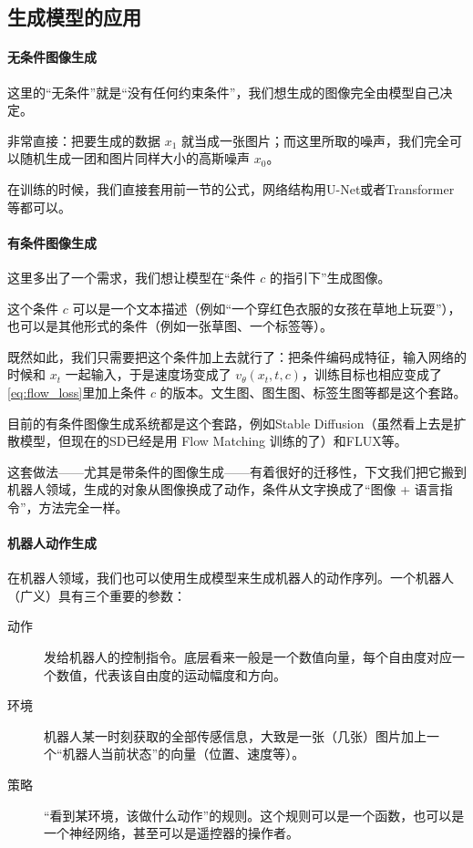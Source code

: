 \subsection{生成模型的应用}

\paragraph{无条件图像生成}

这里的“无条件”就是“没有任何约束条件”，我们想生成的图像完全由模型自己决定。

非常直接：把要生成的数据 $x_1$ 就当成一张图片；而这里所取的噪声，我们完全可以随机生成一团和图片同样大小的高斯噪声 $x_0$。

在训练的时候，我们直接套用前一节的公式，网络结构用U-Net或者Transformer等都可以。

\paragraph{有条件图像生成}

这里多出了一个需求，我们想让模型在“条件 $c$ 的指引下”生成图像。

这个条件 $c$ 可以是一个文本描述（例如“一个穿红色衣服的女孩在草地上玩耍”），也可以是其他形式的条件（例如一张草图、一个标签等）。

既然如此，我们只需要把这个条件加上去就行了：把条件编码成特征，输入网络的时候和 $x_t$ 一起输入，于是速度场变成了 $v_\theta(x_t, t, c)$，训练目标也相应变成了\cref{eq:flow_loss}里加上条件 $c$ 的版本。文生图、图生图、标签生图等都是这个套路。

目前的有条件图像生成系统都是这个套路，例如Stable Diffusion（虽然看上去是扩散模型，但现在的SD已经是用 Flow Matching 训练的了）和FLUX等。

这套做法——尤其是带条件的图像生成——有着很好的迁移性，下文我们把它搬到机器人领域，生成的对象从图像换成了动作，条件从文字换成了“图像 + 语言指令”，方法完全一样。

\paragraph{机器人动作生成}

在机器人领域，我们也可以使用生成模型来生成机器人的动作序列。一个机器人（广义）具有三个重要的参数：
\begin{description}
    \item[动作] 发给机器人的控制指令。底层看来一般是一个数值向量，每个自由度对应一个数值，代表该自由度的运动幅度和方向。
    \item[环境] 机器人某一时刻获取的全部传感信息，大致是一张（几张）图片加上一个“机器人当前状态”的向量（位置、速度等）。
    \item[策略] “看到某环境，该做什么动作”的规则。这个规则可以是一个函数，也可以是一个神经网络，甚至可以是遥控器的操作者。 
\end{description}

